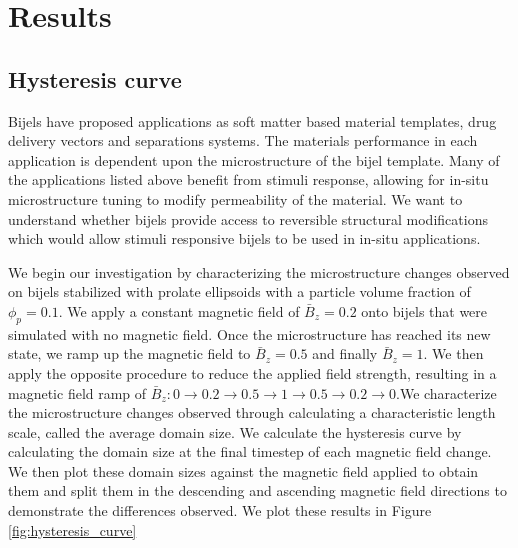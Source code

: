 \section{Results}\label{sec:results_p2}
\subsection{Hysteresis curve}\label{section:hysteresis_curve}

Bijels have proposed applications as soft matter based material templates, drug delivery vectors and separations systems. The materials 
performance in each application is dependent upon the microstructure of the bijel template. Many of the applications listed above benefit 
from stimuli response, allowing for in-situ microstructure tuning to modify permeability of the material. We want to understand whether 
bijels provide access to reversible structural modifications which would allow stimuli responsive bijels to be used in in-situ applications.

We begin our investigation by characterizing the microstructure changes observed on bijels stabilized with prolate ellipsoids with a 
particle volume fraction of $\phi_p = 0.1$. We apply a constant magnetic field of $\bar{B}_z = 0.2$ onto bijels that were simulated 
with no magnetic field. Once the microstructure has reached its new state, we ramp up the magnetic field to $\bar{B}_z = 0.5$ and 
finally $\bar{B}_z = 1$. We then apply the opposite procedure to reduce the applied field strength, resulting in a magnetic field 
ramp of $\bar{B}_z: 0 \rightarrow 0.2 \rightarrow 0.5 \rightarrow 1 \rightarrow 0.5 \rightarrow 0.2 \rightarrow 0$.We characterize the 
microstructure changes observed through calculating a characteristic length scale, called the average domain size. We calculate the hysteresis 
curve by calculating the domain size at the final timestep of each magnetic field change. We then plot these domain sizes against the magnetic field 
applied to obtain them and split them in the descending and ascending magnetic field directions to demonstrate the differences observed. We plot 
these results in Figure \ref{fig:hysteresis_curve}

